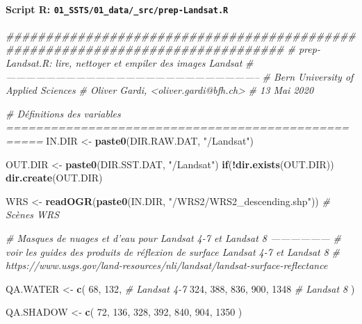 \documentclass[a4paper, notitlepage, 12pt, krantz2]{krantz}
\newenvironment{Shaded}{\begin{snugshade}}{\end{snugshade}}
\newcommand{\CommentTok}[1]{\textcolor[rgb]{0.56,0.35,0.01}{\textit{#1}}}
\newcommand{\ControlFlowTok}[1]{\textcolor[rgb]{0.13,0.29,0.53}{\textbf{#1}}}
\newcommand{\DecValTok}[1]{\textcolor[rgb]{0.00,0.00,0.81}{#1}}
\newcommand{\KeywordTok}[1]{\textcolor[rgb]{0.13,0.29,0.53}{\textbf{#1}}}
\newcommand{\NormalTok}[1]{#1}
\newcommand{\OperatorTok}[1]{\textcolor[rgb]{0.81,0.36,0.00}{\textbf{#1}}}
\newcommand{\StringTok}[1]{\textcolor[rgb]{0.31,0.60,0.02}{#1}}
\let\oldparagraph\paragraph
\renewcommand{\paragraph}[1]{\oldparagraph{#1}\mbox{}}
\begin{document}
\hypertarget{script-r-01_ssts01_data_srcprep-landsat.r}{%
\paragraph{\texorpdfstring{Script R: \texttt{01\_SSTS/01\_data/\_src/prep-Landsat.R}}{Script R: 01\_SSTS/01\_data/\_src/prep-Landsat.R}}\label{script-r-01_ssts01_data_srcprep-landsat.r}}

\begin{Shaded}
\begin{Highlighting}[]
\CommentTok{###############################################################################}
\CommentTok{# prep-Landsat.R: lire, nettoyer et empiler des images Landsat}
\CommentTok{# -----------------------------------------------------------------------------}
\CommentTok{# Bern University of Applied Sciences}
\CommentTok{# Oliver Gardi, <oliver.gardi@bfh.ch>}
\CommentTok{# 13 Mai 2020}

\CommentTok{# Définitions des variables ===================================================}
\NormalTok{IN.DIR  <-}\StringTok{ }\KeywordTok{paste0}\NormalTok{(DIR.RAW.DAT, }\StringTok{"/Landsat"}\NormalTok{)}

\NormalTok{OUT.DIR <-}\StringTok{ }\KeywordTok{paste0}\NormalTok{(DIR.SST.DAT, }\StringTok{"/Landsat"}\NormalTok{)}
\ControlFlowTok{if}\NormalTok{(}\OperatorTok{!}\KeywordTok{dir.exists}\NormalTok{(OUT.DIR)) }\KeywordTok{dir.create}\NormalTok{(OUT.DIR)}

\NormalTok{WRS     <-}\StringTok{ }\KeywordTok{readOGR}\NormalTok{(}\KeywordTok{paste0}\NormalTok{(IN.DIR, }\StringTok{"/WRS2/WRS2_descending.shp"}\NormalTok{))    }\CommentTok{# Scènes WRS}

\CommentTok{# Masques de nuages et d'eau pour Landsat 4-7 et Landsat 8   ------------------}
\CommentTok{# voir les guides des produits de réflexion de surface Landsat 4-7 et Landsat 8}
\CommentTok{# https://www.usgs.gov/land-resources/nli/landsat/landsat-surface-reflectance}

\NormalTok{QA.WATER <-}\StringTok{ }\KeywordTok{c}\NormalTok{(}
  \DecValTok{68}\NormalTok{, }\DecValTok{132}\NormalTok{,                      }\CommentTok{# Landsat 4-7}
  \DecValTok{324}\NormalTok{, }\DecValTok{388}\NormalTok{, }\DecValTok{836}\NormalTok{, }\DecValTok{900}\NormalTok{, }\DecValTok{1348}      \CommentTok{# Landsat 8}
\NormalTok{)}

\NormalTok{QA.SHADOW <-}\StringTok{ }\KeywordTok{c}\NormalTok{(}
  \DecValTok{72}\NormalTok{, }\DecValTok{136}\NormalTok{,}
  \DecValTok{328}\NormalTok{, }\DecValTok{392}\NormalTok{, }\DecValTok{840}\NormalTok{, }\DecValTok{904}\NormalTok{, }\DecValTok{1350}
\NormalTok{)}


\end{Highlighting}
\end{Shaded}
\end{document}
